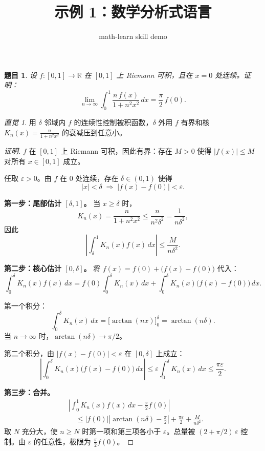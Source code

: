 \documentclass[12pt,a4paper]{ctexart}
\title{示例 1：数学分析式语言}
\author{math-learn skill demo}
\date{}
\theoremstyle{plain}
\newtheorem{problem}{题目}
\theoremstyle{remark}
\newtheorem*{remark*}{直觉}
\newenvironment{solution}{\begin{proof}[证明]}{\end{proof}}
\begin{document}
\maketitle

\noindent{}

\bigskip

\begin{problem}
设 $f:[0,1]\to\mathbb{R}$ 在 $[0,1]$ 上 Riemann 可积，且在 $x=0$ 处连续。证明：
\[
  \lim_{n\to\infty}\int_0^1 \frac{n\,f(x)}{1+n^2 x^2}\,dx = \frac{\pi}{2}\,f(0).
\]
\end{problem}

\begin{remark*}
用 $\delta$ 邻域内 $f$ 的连续性控制被积函数，$\delta$ 外用 $f$ 有界和核 $K_n(x)=\frac{n}{1+n^2x^2}$ 的衰减压到任意小。
\end{remark*}

\begin{solution}
$f$ 在 $[0,1]$ 上 Riemann 可积，因此有界：存在 $M>0$ 使得 $|f(x)|\le M$ 对所有 $x\in[0,1]$ 成立。

任取 $\varepsilon>0$。由 $f$ 在 $0$ 处连续，存在 $\delta\in(0,1)$ 使得
\[
  |x|<\delta \;\Longrightarrow\; |f(x)-f(0)|<\varepsilon.
\]

\textbf{第一步：尾部估计 $[\delta,1]$。}
当 $x\ge\delta$ 时，
\[
  K_n(x)=\frac{n}{1+n^2x^2}\le\frac{n}{n^2\delta^2}=\frac{1}{n\delta^2},
\]
因此
\[
  \left|\int_\delta^1 K_n(x)f(x)\,dx\right|\le\frac{M}{n\delta^2}. \tag{1}
\]

\textbf{第二步：核心估计 $[0,\delta]$。}
将 $f(x)=f(0)+\bigl(f(x)-f(0)\bigr)$ 代入：
\[
  \int_0^\delta K_n(x)f(x)\,dx = f(0)\int_0^\delta K_n(x)\,dx + \int_0^\delta K_n(x)\bigl(f(x)-f(0)\bigr)\,dx.
\]

第一个积分：
\[
  \int_0^\delta K_n(x)\,dx = \bigl[\arctan(nx)\bigr]_0^\delta = \arctan(n\delta). \tag{2}
\]
当 $n\to\infty$ 时，$\arctan(n\delta)\to\pi/2$。

第二个积分，由 $|f(x)-f(0)|<\varepsilon$ 在 $[0,\delta]$ 上成立：
\[
  \left|\int_0^\delta K_n(x)\bigl(f(x)-f(0)\bigr)\,dx\right| \le \varepsilon\int_0^\delta K_n(x)\,dx \le \frac{\pi\varepsilon}{2}. \tag{3}
\]

\textbf{第三步：合并。}
\begin{align*}
  &\left|\int_0^1 K_n(x)f(x)\,dx - \frac{\pi}{2}f(0)\right| \\
  &\quad\le |f(0)|\left|\arctan(n\delta)-\frac{\pi}{2}\right| + \frac{\pi\varepsilon}{2} + \frac{M}{n\delta^2}.
\end{align*}
取 $N$ 充分大，使 $n\ge N$ 时第一项和第三项各小于 $\varepsilon$。总量被 $(2+\pi/2)\,\varepsilon$ 控制。由 $\varepsilon$ 的任意性，极限为 $\frac{\pi}{2}f(0)$。
\end{solution}
\end{document}
